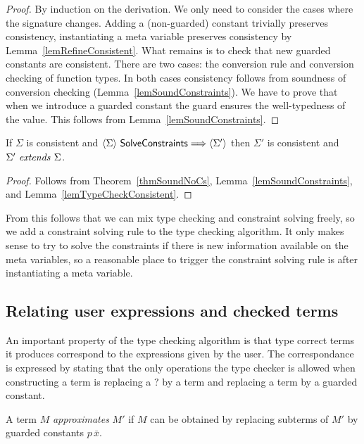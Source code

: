 \begin{proof}
\if {}
    By induction on the derivation. We only need to consider the cases where
    the signature changes. Adding a (non-guarded) constant trivially preserves
    consistency, instantiating a meta variable preserves consistency by
    Lemma~\ref{lemRefineConsistent}. What remains is to check that new guarded
    constants are consistent. There are two cases: the conversion rule and
    conversion checking of function types. In both cases consistency follows
    from soundness of conversion checking (Lemma~\ref{lemSoundConstraints}).
\else
    We have to prove that when we introduce a guarded constant the guard
    ensures the well-typedness of the value. This follows from
    Lemma~\ref{lemSoundConstraints}.
\fi
\end{proof}

\begin{lemma} \label{lemSolveConsistent}
    If $\Sigma$ is consistent and $\langle {\Sigma} \rangle ~ {\mathsf{SolveConstraints}} \Longrightarrow \langle {\Sigma'} \rangle$ then $\Sigma'$ is consistent and ${\Sigma'} ~ \mathit{extends} ~ {\Sigma}$.
\end{lemma}

\begin{proof}
    Follows from Theorem~\ref{thmSoundNoCs}, Lemma~\ref{lemSoundConstraints},
    and Lemma~\ref{lemTypeCheckConsistent}.
\end{proof}

From this follows that we can mix type checking and constraint solving freely,
so we add a constraint solving rule to the type checking algorithm. It only
makes sense to try to solve the constraints if there is new information
available on the meta variables, so a reasonable place to trigger the
constraint solving rule is after instantiating a meta variable.

\subsection{Relating user expressions and checked terms}

An important property of the type checking algorithm is that type correct terms
it produces correspond to the expressions given by the user. The correspondance
is expressed by stating that the only operations the type checker is allowed
when constructing a term is replacing a $?$ by a term and replacing a term by a
guarded constant.

\begin{definition}[Approximation]
    A term $M$ {\em approximates} $M'$ if $M$ can be obtained by replacing
    subterms of $M'$ by guarded constants $p \, \bar x$.
\end{definition}


